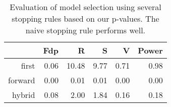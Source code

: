 \begin{table}[ht]
\centering
\begin{tabular}{rrrrrr}
  \hline
 & Fdp & R & S & V & Power \\ 
  \hline
first & 0.06 & 10.48 & 9.77 & 0.71 & 0.98 \\ 
  forward & 0.00 & 0.01 & 0.01 & 0.00 & 0.00 \\ 
  hybrid & 0.08 & 2.00 & 1.84 & 0.16 & 0.18 \\ 
   \hline
\end{tabular}
\caption{Evaluation of model selection using several stopping rules based on our p-values. The naive stopping rule performs well.} 
\end{table}

